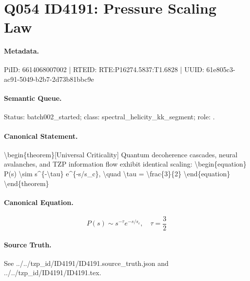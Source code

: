 \section*{Q054 ID4191: Pressure Scaling Law}
\paragraph{Metadata.}
PiID: 6614068007002 | RTEID: RTE:P16274.5837:T1.6828 | UUID: 61e805c3-ac91-5049-b2b7-2d73b81bbc9e

\paragraph{Semantic Queue.}
Status: batch002\_started; class: spectral\_helicity\_kk\_segment; role: .

\paragraph{Canonical Statement.}
\textbackslash{}begin\{theorem\}[Universal Criticality] Quantum decoherence cascades, neural avalanches, and TZP information flow exhibit identical scaling: \textbackslash{}begin\{equation\} P(s) \textbackslash{}sim s\textasciicircum{}\{-\textbackslash{}tau\} e\textasciicircum{}\{-s/s\_c\}, \textbackslash{}quad \textbackslash{}tau = \textbackslash{}frac\{3\}\{2\} \textbackslash{}end\{equation\} \textbackslash{}end\{theorem\}

\paragraph{Canonical Equation.}
\[
\begin{equation} P(s) \sim s^{-\tau} e^{-s/s_c}, \quad \tau = \frac{3}{2} \end{equation}
\]

\paragraph{Source Truth.}
See ../../tzp\_id/ID4191/ID4191.source\_truth.json and ../../tzp\_id/ID4191/ID4191.tex.
